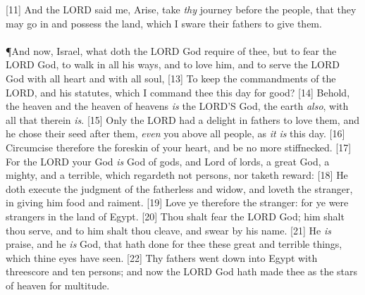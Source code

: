 [11] \textcolor[cmyk]{0.99998,1,0,0}{And the LORD said  me, Arise, take \emph{thy} journey before the people, that they may go in and possess the land, which I sware  their fathers to give  them.}\\
\\
\P \textcolor[cmyk]{0.99998,1,0,0}{And now, Israel, what doth the LORD  God require of thee, but to fear the LORD  God, to walk in all his ways, and to love him, and to serve the LORD  God with all  heart and with all  soul,}
[13] \textcolor[cmyk]{0.99998,1,0,0}{To keep the commandments of the LORD, and his statutes, which I command thee this day for  good?}
[14] \textcolor[cmyk]{0.99998,1,0,0}{Behold, the heaven and the heaven of heavens \emph{is} the LORD'S  God, the earth \emph{also}, with all that therein \emph{is}.}
[15] \textcolor[cmyk]{0.99998,1,0,0}{Only the LORD had a delight in  fathers to love them, and he chose their seed after them, \emph{even} you above all people, as \emph{it} \emph{is} this day.}
[16] \textcolor[cmyk]{0.99998,1,0,0}{Circumcise therefore the foreskin of your heart, and be no more stiffnecked.}
[17] \textcolor[cmyk]{0.99998,1,0,0}{For the LORD your God \emph{is} God of gods, and Lord of lords, a great God, a mighty, and a terrible, which regardeth not persons, nor taketh reward:}
[18] \textcolor[cmyk]{0.99998,1,0,0}{He doth execute the judgment of the fatherless and widow, and loveth the stranger, in giving him food and raiment.}
[19] \textcolor[cmyk]{0.99998,1,0,0}{Love ye therefore the stranger: for ye were strangers in the land of Egypt.}
[20] \textcolor[cmyk]{0.99998,1,0,0}{Thou shalt fear the LORD  God; him shalt thou serve, and to him shalt thou cleave, and swear by his name.}
[21] \textcolor[cmyk]{0.99998,1,0,0}{He \emph{is}  praise, and he \emph{is}  God, that hath done for thee these great and terrible things, which thine eyes have seen.}
[22] \textcolor[cmyk]{0.99998,1,0,0}{Thy fathers went down into Egypt with threescore and ten persons; and now the LORD  God hath made thee as the stars of heaven for multitude.}